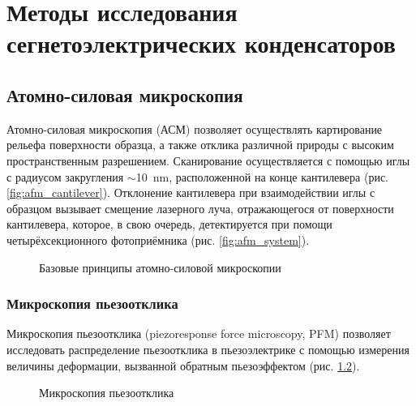 \chapter{Методы исследования сегнетоэлектрических конденсаторов}\label{ch:ch2}

\section{Атомно-силовая микроскопия}\label{sec:ch2/sect1}
Атомно-силовая микроскопия (АСМ) позволяет осуществлять картирование рельефа поверхности образца, а также отклика различной природы с высоким пространственным разрешением. Сканирование осуществляется с помощью иглы с радиусом закругления \(\sim\)\SI{10}{\nm}, расположенной на конце кантилевера (рис. \cref{fig:afm_cantilever}). Отклонение кантилевера при взаимодействии иглы с образцом вызывает смещение лазерного луча, отражающегося от поверхности кантилевера, которое, в свою очередь, детектируется при помощи четырёхсекционного фотоприёмника (рис. \cref{fig:afm_system}).

\begin{figure}[ht]
    \caption[Этот текст попадает в названия рисунков в списке рисунков]{Базовые принципы атомно-силовой микроскопии}\label{fig:afm}
\end{figure}

\subsection{Микроскопия пьезоотклика}\label{sec:ch2/sect1/sub1}
Микроскопия пьезоотклика (piezoresponse force microscopy, PFM) позволяет исследовать распределение пьезоотклика в пьезоэлектрике с помощью измерения величины деформации, вызванной обратным пьезоэффектом (рис. \cref{fig:pfm}).

\begin{figure}[ht]
    \caption{Микроскопия пьезоотклика}\label{fig:pfm}
\end{figure}


